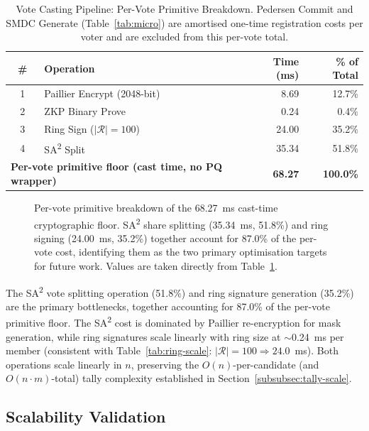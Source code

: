 \begin{table}[H]
\centering
\caption[Vote Casting Pipeline: Per-Vote Primitive Breakdown]{Vote Casting Pipeline: Per-Vote Primitive Breakdown. Pedersen Commit and SMDC Generate (Table~\ref{tab:micro}) are amortised one-time registration costs per voter and are excluded from this per-vote total.}
\label{tab:pipeline}
\begin{tabular}{|c|l|r|r|}
\hline
\textbf{\#} & \textbf{Operation} & \textbf{Time (ms)} & \textbf{\% of Total} \\
\hline
1 & Paillier Encrypt (2048-bit) & 8.69 & 12.7\% \\
\hline
2 & ZKP Binary Prove & 0.24 & 0.4\% \\
\hline
3 & Ring Sign ($|\mathcal{R}|=100$) & 24.00 & 35.2\% \\
\hline
4 & SA\textsuperscript{2} Split & 35.34 & 51.8\% \\
\hline
\multicolumn{2}{|l|}{\textbf{Per-vote primitive floor (cast time, no PQ wrapper)}} & \textbf{68.27} & \textbf{100.0\%} \\
\hline
\end{tabular}
\end{table}

\begin{figure}[H]
\centering

\caption[Vote Pipeline Per-Vote Primitive Breakdown]{Per-vote primitive breakdown of the 68.27~ms cast-time cryptographic floor. SA\textsuperscript{2} share splitting (35.34~ms, 51.8\%) and ring signing (24.00~ms, 35.2\%) together account for 87.0\% of the per-vote cost, identifying them as the two primary optimisation targets for future work. Values are taken directly from Table~\ref{tab:pipeline}.}
\label{fig:pipeline-breakdown}
\end{figure}

The SA\textsuperscript{2} vote splitting operation (51.8\%) and ring signature generation (35.2\%) are the primary bottlenecks, together accounting for 87.0\% of the per-vote primitive floor. The SA\textsuperscript{2} cost is dominated by Paillier re-encryption for mask generation, while ring signatures scale linearly with ring size at $\sim$0.24~ms per member (consistent with Table~\ref{tab:ring-scale}: $|\mathcal{R}|=100 \Rightarrow 24.0$~ms). Both operations scale linearly in $n$, preserving the $O(n)$-per-candidate (and $O(n \cdot m)$-total) tally complexity established in Section~\ref{subsubsec:tally-scale}.

\subsection{Scalability Validation}
\label{subsec:scalability}

